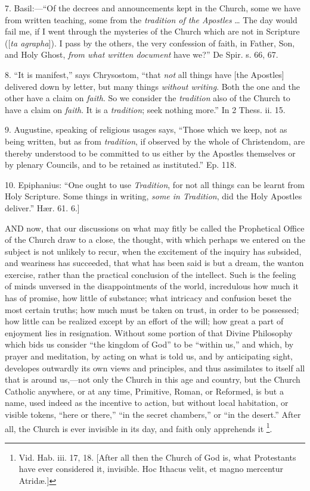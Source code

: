 7. Basil:—``Of the decrees and announcements kept in the
Church, some we have from written teaching, some from the \emph{tradition
of the Apostles} … The day would fail me, if I went through the
mysteries of the Church which are not in Scripture ([\emph{ta agrapha}]).
I pass by the others, the very confession of faith, in Father, Son,
and Holy Ghost, \emph{from what written document} have we?'' De
Spir. s. 66, 67.

8. ``It is manifest,'' says Chrysostom, ``that
\emph{not} all
things have [the Apostles] delivered down by letter, but many things \emph{without
writing}. Both the one and the other have a claim on \emph{faith}.
So we consider the \emph{tradition} also of the Church to have a claim
on \emph{faith}. It is a \emph{tradition}; seek nothing more.'' In
2 Thess. ii. 15.

9. Augustine, speaking of religious usages says, ``Those which
we keep, not as being written, but as from \emph{tradition}, if
observed by the whole of Christendom, are thereby understood to be
committed to us either by the Apostles themselves or by plenary
Councils, and to be retained as instituted.'' Ep. 118.

10. Epiphanius: ``One ought to use \emph{Tradition}, for not
all things can be learnt from Holy Scripture. Some things in writing, \emph{some
in Tradition}, did the Holy Apostles deliver.'' Hær. 61. 6.]


AND now, that our discussions on what
may fitly be called the Prophetical Office of the Church draw to a
close, the thought, with which perhaps we entered on the subject is
not unlikely to recur, when the excitement of the inquiry has
subsided, and weariness has succeeded, that what has been said is but
a dream, the wanton exercise, rather than the practical conclusion of
the intellect. Such is the feeling of minds unversed in the
disappointments of the world, incredulous how much it has of promise,
how little of substance; what intricacy and confusion beset the most
certain truths; how much must be taken on trust, in order to be
possessed; how little can be realized except by an effort of the will;
how great a part of enjoyment lies in resignation. Without some
portion of that Divine Philosophy which bids us consider ``the
kingdom of God'' to be ``within us,'' and which, by prayer
and meditation, by acting on what is told us, and by anticipating
sight, developes outwardly its own views and principles, and thus
assimilates to itself all that is around us,—not only the Church in
this age and country, but the Church Catholic anywhere, or at any
time, Primitive, Roman, or Reformed, is but a name, used indeed as the
incentive to action, but without local habitation, or visible tokens,
``here or there,'' ``in the secret chambers,'' or
``in the desert.'' After all, the Church is ever
invisible in its day, and faith only apprehends it \footnote{Vid. Hab. iii. 17, 18. [After all then the Church of God is,
what Protestants have ever considered it, invisible. Hoc Ithacus velit,
et magno mercentur Atridæ.]}.

